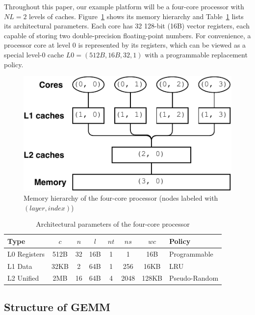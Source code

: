Throughout this paper, our example platform will be
a four-core processor with
$NL=2$ levels of caches.
Figure~\ref{fig:hierarchy} shows its memory hierarchy 
and Table~\ref{tab:cluster} lists its
architectural parameters. 
Each core has 32 128-bit (16B) vector registers,
each capable of storing two double-precision floating-point numbers.
For convenience, a processor core at level 0
is represented by its registers, which can be viewed as a special
level-0 cache $L0 = (512B, 16B, 32, 1)$ with a programmable replacement policy.

\begin{figure}
  \centering
  \includegraphics[width=.65\textwidth]{figures/cluster-new}
  \caption{Memory hierarchy of the four-core processor
    (nodes labeled with $(layer,index)$)}
  \label{fig:hierarchy}
\end{figure}

\begin{table}
  \centering
  \caption{Architectural parameters of the four-core processor}
  \label{tab:cluster}
  \begin{tabular}{lccccccl}
    \toprule
    Type & $c$ & $n$ & $l$ & $nt$ & $ns$ & $wc$ & Policy \\
    \midrule
    L0 Registers  & 512B & 32 & 16B & 1 & 1 & 16B & Programmable \\
    L1 Data    & 32KB & 2  & 64B & 1 & 256 & 16KB & LRU \\
    L2 Unified & 2MB  & 16 & 64B & 4 & 2048 & 128KB & Pseudo-Random \\
    \bottomrule
  \end{tabular}
\end{table}

\subsection{Structure of GEMM}\label{subsec:gemm}

